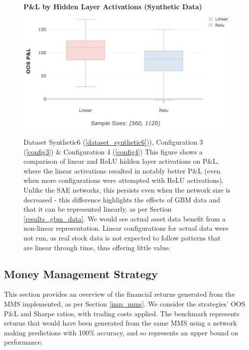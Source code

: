 \documentclass[a4paper,11pt,oneside]{article}
\theoremstyle{plain}
\theoremstyle{definition}
\begin{document}
	\begin{figure}[H]
		\centering
		\textbf{P\&L by Hidden Layer Activations (Synthetic Data)}
		\includegraphics[scale=0.35]{images/results/8_7_network/synth_pl_hidden.png}
		\caption[P\&L by Hidden Layer Activations (Synthetic Data)]
		{Dataset Synthetic6  (\ref{dataset_synthetic6})), Configuration 3 (\ref{config3}) \& Configuration 4 (\ref{config4})
			\newline This figure shows a comparison of linear and ReLU hidden layer activations on P\&L, where the linear activations resulted in notably better P\&L (even when more configurations were attempted with ReLU activations). Unlike the SAE networks, this persists even when the network size is decreased - this difference highlights the effects of GBM data and that it can be represented linearly, as per Section \ref{results_gbm_data}. We would see actual asset data benefit from a non-linear representation. Linear configurations for actual data were not run, as real stock data is not expected to follow patterns that are linear through time, thus offering little value.}
		\label{figure-synth_pl_hidden}
	\end{figure}
	
	
	
	\newpage
	\subsection{Money Management Strategy}\label{results_mms}
	
	This section provides an overview of the financial returns generated from the MMS implemented, as per Section \ref{imp_mms}. We consider the strategies' OOS P\&L and Sharpe ratios, with trading costs applied. The benchmark represents returns that would have been generated from the same MMS using a network making predictions with 100\% accuracy, and so represents an upper bound on performance.\newline
	
\end{document}

